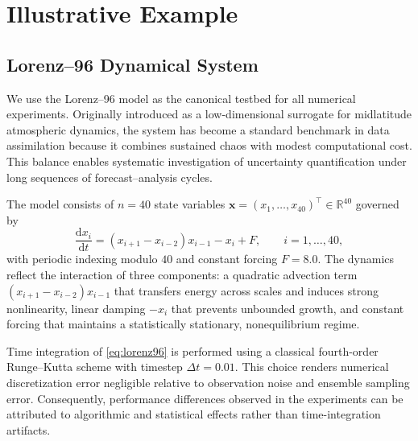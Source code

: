 \documentclass[11pt,a4paper]{article}
\begin{document}



\section{Illustrative Example}\label{sec:motivation}


\subsection{Lorenz--96 Dynamical System}
\label{subsec:lorenz96_problem}

We use the Lorenz--96 model \citep{lorenz1996predictability} as the canonical testbed for all numerical experiments. Originally introduced as a low-dimensional surrogate for midlatitude atmospheric dynamics, the system has become a standard benchmark in data assimilation because it combines sustained chaos with modest computational cost. This balance enables systematic investigation of uncertainty quantification under long sequences of forecast--analysis cycles.

The model consists of $n=40$ state variables $\mathbf{x}=(x_1,\ldots,x_{40})^\top\in\mathbb{R}^{40}$ governed by
\begin{equation}
\frac{\mathrm{d}x_i}{\mathrm{d}t}
=
(x_{i+1}-x_{i-2})x_{i-1}-x_i+F,
\qquad i=1,\ldots,40,
\label{eq:lorenz96}
\end{equation}
with periodic indexing modulo $40$ and constant forcing $F=8.0$. The dynamics reflect the interaction of three components: a quadratic advection term $(x_{i+1}-x_{i-2})x_{i-1}$ that transfers energy across scales and induces strong nonlinearity, linear damping $-x_i$ that prevents unbounded growth, and constant forcing that maintains a statistically stationary, nonequilibrium regime.

Time integration of \eqref{eq:lorenz96} is performed using a classical fourth-order Runge--Kutta scheme with timestep $\Delta t=0.01$. This choice renders numerical discretization error negligible relative to observation noise and ensemble sampling error. Consequently, performance differences observed in the experiments can be attributed to algorithmic and statistical effects rather than time-integration artifacts.
\end{document}
